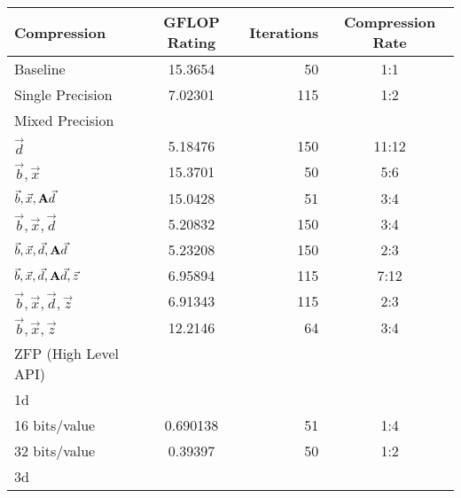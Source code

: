 \begin{table}
	\centering
	\begin{tabular}{l|S|r|c}
		Compression & {GFLOP Rating} & Iterations & Compression Rate\\
		\hline
		Baseline & 15.3654 & 50 & 1:1 \\ %
		Single Precision & 7.02301 & 115 & 1:2 \\
		Mixed Precision & & & \\ %
		\hspace{3mm} \(\vec{d}\) & 5.18476 & 150 & 11:12 \\
		\hspace{3mm} \(\vec{b}, \vec{x}\) & 15.3701 & 50 & 5:6 \\
		\hspace{3mm} \(\vec{b}, \vec{x}, \mathbf{A}\vec{d}\) & 15.0428 & 51 & 3:4 \\
		\hspace{3mm} \(\vec{b}, \vec{x}, \vec{d}\) & 5.20832 & 150 & 3:4 \\ %
		\hspace{3mm} \(\vec{b}, \vec{x}, \vec{d}, \mathbf{A}\vec{d}\) & 5.23208 & 150 & 2:3 \\
		\hspace{3mm} \(\vec{b}, \vec{x}, \vec{d}, \mathbf{A}\vec{d}, \vec{z}\) & 6.95894 & 115 & 7:12 \\
		\hspace{3mm} \(\vec{b}, \vec{x}, \vec{d}, \vec{z}\) & 6.91343 & 115 & 2:3 \\
		\hspace{3mm} \(\vec{b}, \vec{x}, \vec{z}\) & 12.2146 & 64 & 3:4 \\
		ZFP (High Level API) & & & \\
		\hspace{3mm} 1d & & & \\
			\hspace{6mm} 16 bits/value & 0.690138 & 51 & 1:4 \\
			\hspace{6mm} 32 bits/value & 0.39397 & 50 & 1:2 \\
		\hspace{3mm} 3d & & & \\

\end{tabular}
\end{table}

